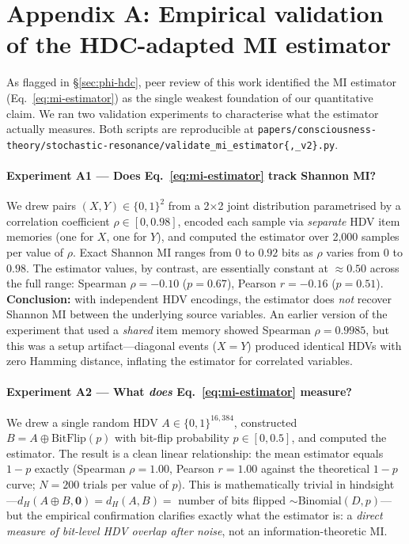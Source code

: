 \documentclass[12pt,a4paper]{article}
\begin{document}
\section*{Appendix A: Empirical validation of the HDC-adapted MI estimator}
\label{sec:appendix-mi}

As flagged in \S\ref{sec:phi-hdc}, peer review of this work identified
the MI estimator (Eq.~\ref{eq:mi-estimator}) as the single weakest
foundation of our quantitative claim. We ran two validation experiments
to characterise what the estimator actually measures. Both scripts are
reproducible at \texttt{papers/consciousness-theory/stochastic-resonance/validate\_mi\_estimator\{,\_v2\}.py}.

\paragraph{Experiment A1 — Does Eq.~\ref{eq:mi-estimator} track Shannon MI?}
We drew pairs $(X, Y) \in \{0,1\}^2$ from a 2$\times$2 joint distribution
parametrised by a correlation coefficient $\rho \in [0, 0.98]$, encoded
each sample via \emph{separate} HDV item memories (one for $X$, one for
$Y$), and computed the estimator over 2{,}000 samples per value of
$\rho$. Exact Shannon MI ranges from $0$ to $0.92$ bits as $\rho$ varies
from $0$ to $0.98$. The estimator values, by contrast, are essentially
constant at $\approx 0.50$ across the full range: Spearman
$\rho = -0.10$ ($p = 0.67$), Pearson $r = -0.16$ ($p = 0.51$).
\textbf{Conclusion:} with independent HDV encodings, the estimator
does \emph{not} recover Shannon MI between the underlying source
variables. An earlier version of the experiment that used a
\emph{shared} item memory showed Spearman $\rho = 0.9985$, but this was
a setup artifact---diagonal events ($X=Y$) produced identical HDVs
with zero Hamming distance, inflating the estimator for correlated
variables.

\paragraph{Experiment A2 — What \emph{does} Eq.~\ref{eq:mi-estimator} measure?}
We drew a single random HDV $A \in \{0,1\}^{16{,}384}$, constructed
$B = A \oplus \text{BitFlip}(p)$ with bit-flip probability
$p \in [0, 0.5]$, and computed the estimator. The result is a clean
linear relationship: the mean estimator equals $1 - p$ exactly
(Spearman $\rho = 1.00$, Pearson $r = 1.00$ against the theoretical
$1 - p$ curve; $N = 200$ trials per value of $p$). This is
mathematically trivial in hindsight---$d_H(A \oplus B, \mathbf{0}) =
d_H(A, B) =$ number of bits flipped $\sim \text{Binomial}(D, p)$---but
the empirical confirmation clarifies exactly what the estimator is:
a \emph{direct measure of bit-level HDV overlap after noise}, not an
information-theoretic MI.
\end{document}
